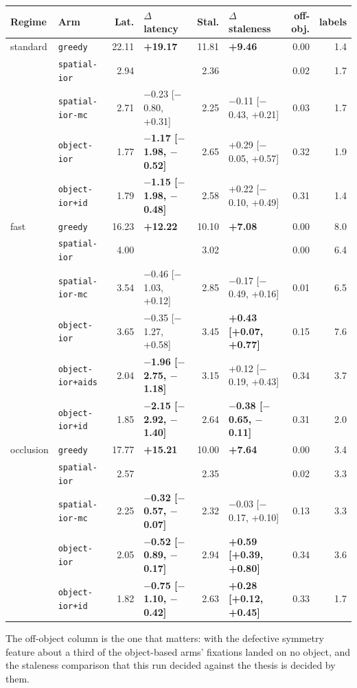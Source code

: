 \documentclass[11pt,a4paper]{article}
\newcommand{\arm}[1]{\texttt{#1}}
\newcommand{\sig}[1]{\textbf{#1}} %
\begin{document}
\begin{center}\scriptsize
\begin{tabular}{@{}llrlrlrr@{}}
\toprule
Regime & Arm & Lat. & $\Delta$ latency & Stal. & $\Delta$ staleness & off-obj. & labels \\
\midrule
standard & \arm{greedy}         & 22.11 & \sig{+19.17} & 11.81 & \sig{+9.46} & 0.00 & 1.4 \\
         & \arm{spatial-ior}    &  2.94 &              &  2.36 &             & 0.02 & 1.7 \\
         & \arm{spatial-ior-mc} &  2.71 & $-$0.23 [$-$0.80, +0.31] & 2.25 & $-$0.11 [$-$0.43, +0.21] & 0.03 & 1.7 \\
         & \arm{object-ior}     &  1.77 & \sig{$-$1.17 [$-$1.98, $-$0.52]} & 2.65 & +0.29 [$-$0.05, +0.57] & 0.32 & 1.9 \\
         & \arm{object-ior+id}  &  1.79 & \sig{$-$1.15 [$-$1.98, $-$0.48]} & 2.58 & +0.22 [$-$0.10, +0.49] & 0.31 & 1.4 \\
\addlinespace
fast & \arm{greedy}         & 16.23 & \sig{+12.22} & 10.10 & \sig{+7.08} & 0.00 & 8.0 \\
     & \arm{spatial-ior}    &  4.00 &              &  3.02 &             & 0.00 & 6.4 \\
     & \arm{spatial-ior-mc} &  3.54 & $-$0.46 [$-$1.03, +0.12] & 2.85 & $-$0.17 [$-$0.49, +0.16] & 0.01 & 6.5 \\
     & \arm{object-ior}     &  3.65 & $-$0.35 [$-$1.27, +0.58] & 3.45 & \sig{+0.43 [+0.07, +0.77]} & 0.15 & 7.6 \\
     & \arm{object-ior+aids}&  2.04 & \sig{$-$1.96 [$-$2.75, $-$1.18]} & 3.15 & +0.12 [$-$0.19, +0.43] & 0.34 & 3.7 \\
     & \arm{object-ior+id}  &  1.85 & \sig{$-$2.15 [$-$2.92, $-$1.40]} & 2.64 & \sig{$-$0.38 [$-$0.65, $-$0.11]} & 0.31 & 2.0 \\
\addlinespace
occlusion & \arm{greedy}         & 17.77 & \sig{+15.21} & 10.00 & \sig{+7.64} & 0.00 & 3.4 \\
          & \arm{spatial-ior}    &  2.57 &              &  2.35 &             & 0.02 & 3.3 \\
          & \arm{spatial-ior-mc} &  2.25 & \sig{$-$0.32 [$-$0.57, $-$0.07]} & 2.32 & $-$0.03 [$-$0.17, +0.10] & 0.13 & 3.3 \\
          & \arm{object-ior}     &  2.05 & \sig{$-$0.52 [$-$0.89, $-$0.17]} & 2.94 & \sig{+0.59 [+0.39, +0.80]} & 0.34 & 3.6 \\
          & \arm{object-ior+id}  &  1.82 & \sig{$-$0.75 [$-$1.10, $-$0.42]} & 2.63 & \sig{+0.28 [+0.12, +0.45]} & 0.33 & 1.7 \\
\bottomrule
\end{tabular}
\end{center}

The off-object column is the one that matters: with the defective symmetry
feature about a third of the object-based arms' fixations landed on no object,
and the staleness comparison that this run decided against the thesis is
decided by them.
\end{document}
